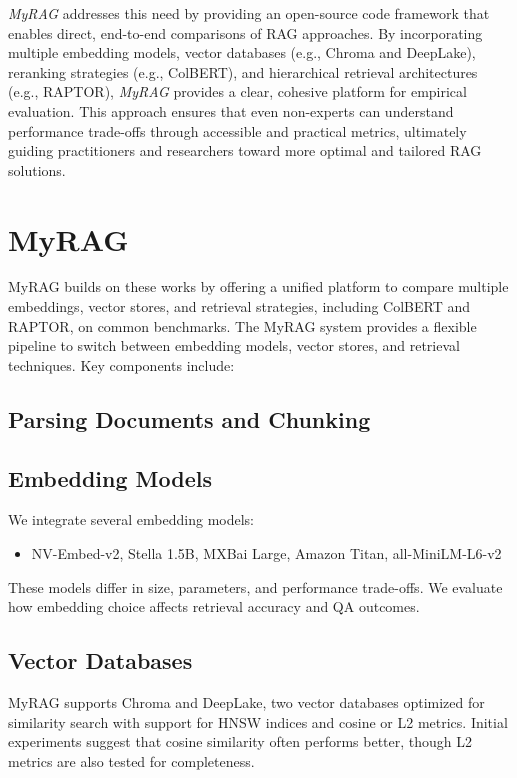 \documentclass{scrartcl}
\begin{document}
\textit{MyRAG} addresses this need by providing an open-source code framework that enables direct, end-to-end comparisons of RAG approaches. By incorporating multiple embedding models, vector databases (e.g., Chroma and DeepLake), reranking strategies (e.g., ColBERT), and hierarchical retrieval architectures (e.g., RAPTOR), \textit{MyRAG} provides a clear, cohesive platform for empirical evaluation. This approach ensures that even non-experts can understand performance trade-offs through accessible and practical metrics, ultimately guiding practitioners and researchers toward more optimal and tailored RAG solutions.
\section{MyRAG}
MyRAG builds on these works by offering a unified platform to compare multiple embeddings, vector stores, and retrieval strategies, including ColBERT and RAPTOR, on common benchmarks.
The MyRAG system provides a flexible pipeline to switch between embedding models, vector stores, and retrieval techniques. Key components include:

\subsection{Parsing Documents and Chunking}

\subsection{Embedding Models}

We integrate several embedding models:
\begin{itemize}
    \item NV-Embed-v2, Stella 1.5B, MXBai Large, Amazon Titan, all-MiniLM-L6-v2
\end{itemize}
These models differ in size, parameters, and performance trade-offs. We evaluate how embedding choice affects retrieval accuracy and QA outcomes.

\subsection{Vector Databases}

MyRAG supports Chroma and DeepLake, two vector databases optimized for similarity search with support for HNSW indices and cosine or L2 metrics. Initial experiments suggest that cosine similarity often performs better, though L2 metrics are also tested for completeness.
\end{document}
